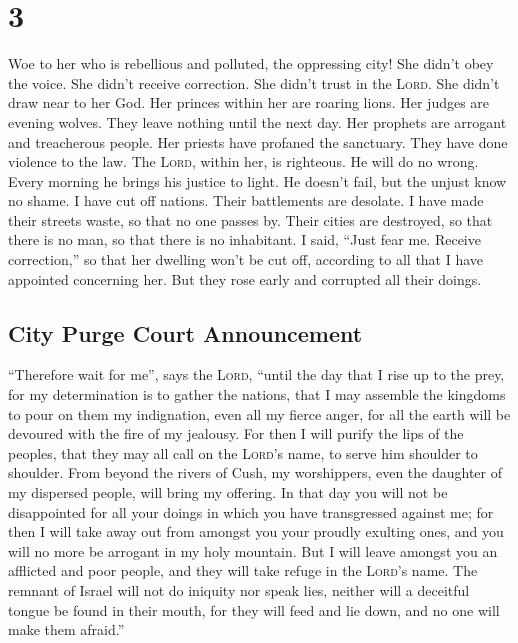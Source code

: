 \hypertarget{section-2}{%
\section{3}\label{section-2}}

 Woe to her who is rebellious and polluted, the oppressing
city!  She didn't obey the voice. She didn't receive
correction. She didn't trust in the \textsc{Lord}. She didn't draw near
to her God.  Her princes within her are roaring lions. Her
judges are evening wolves. They leave nothing until the next day.
 Her prophets are arrogant and treacherous people. Her
priests have profaned the sanctuary. They have done violence to the law.
 The \textsc{Lord}, within her, is righteous. He will do
no wrong. Every morning he brings his justice to light. He doesn't fail,
but the unjust know no shame.  I have cut off nations.
Their battlements are desolate. I have made their streets waste, so that
no one passes by. Their cities are destroyed, so that there is no man,
so that there is no inhabitant.  I said, ``Just fear me.
Receive correction,'' so that her dwelling won't be cut off, according
to all that I have appointed concerning her. But they rose early and
corrupted all their doings.

\hypertarget{city-purge-court-announcement}{%
\subsection{City Purge Court
Announcement}\label{city-purge-court-announcement}}

 ``Therefore wait for me'', says the \textsc{Lord},
``until the day that I rise up to the prey, for my determination is to
gather the nations, that I may assemble the kingdoms to pour on them my
indignation, even all my fierce anger, for all the earth will be
devoured with the fire of my jealousy.  For then I will
purify the lips of the peoples, that they may all call on the
\textsc{Lord}'s name, to serve him shoulder to shoulder. 
From beyond the rivers of Cush, my worshippers, even the daughter of my
dispersed people, will bring my offering.  In that day
you will not be disappointed for all your doings in which you have
transgressed against me; for then I will take away out from amongst you
your proudly exulting ones, and you will no more be arrogant in my holy
mountain.  But I will leave amongst you an afflicted and
poor people, and they will take refuge in the \textsc{Lord}'s name.
 The remnant of Israel will not do iniquity nor speak
lies, neither will a deceitful tongue be found in their mouth, for they
will feed and lie down, and no one will make them afraid.''

